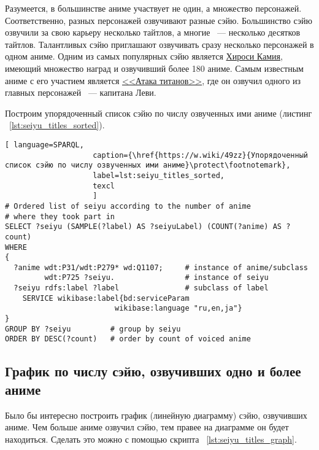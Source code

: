 Разумеется, в большинстве аниме участвует не один, а множество персонажей. Соответственно, разных персонажей озвучивают разные сэйю. Большинство сэйю озвучили за свою карьеру несколько тайтлов, а многие ~--- несколько десятков тайтлов. Талантливых сэйю приглашают озвучивать сразу несколько персонажей в одном аниме. Одним из самых популярных сэйю является \href{https://w.wiki/4L5q}{Хироси Камия}, имеющий множество наград и озвучивший более 180 аниме. Самым известным аниме с его участием является \href{https://w.wiki/4L5r}{<<Атака титанов>>}, где он озвучил одного из главных персонажей ~--- капитана Леви.

Построим упорядоченный список сэйю по числу озвученных ими аниме (листинг ~\protect\ref{lst:seiyu_titles_sorted}).

\begin{lstlisting}[ language=SPARQL, 
                    caption={\href{https://w.wiki/49zz}{Упорядоченный список сэйю по числу озвученных ими аниме}\protect\footnotemark},
                    label=lst:seiyu_titles_sorted,
                    texcl 
                    ]
# Ordered list of seiyu according to the number of anime
# where they took part in
SELECT ?seiyu (SAMPLE(?label) AS ?seiyuLabel) (COUNT(?anime) AS ?count)
WHERE
{
  ?anime wdt:P31/wdt:P279* wd:Q1107;	 # instance of anime/subclass
         wdt:P725 ?seiyu. 	             # instance of seiyu
  ?seiyu rdfs:label ?label	             # subclass of label
    SERVICE wikibase:label{bd:serviceParam
					     wikibase:language "ru,en,ja"}
}
GROUP BY ?seiyu		    # group by seiyu 
ORDER BY DESC(?count)	# order by count of voiced anime
\end{lstlisting}%

\subsection{График по числу сэйю, озвучивших одно и более аниме}

Было бы интересно построить график (линейную диаграмму) сэйю, озвучивших аниме. Чем больше аниме озвучил сэйю, тем правее на диаграмме он будет находиться. Сделать это можно с помощью скрипта ~\protect\ref{lst:seiyu_titles_graph}.

